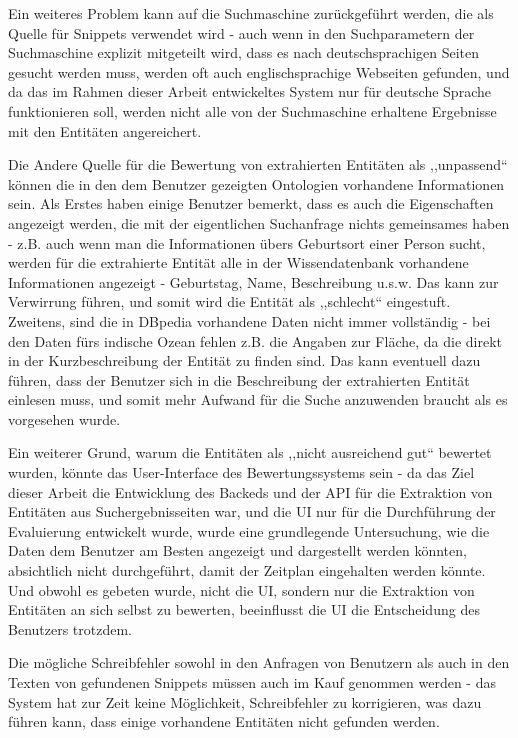 Ein weiteres Problem kann auf die Suchmaschine zurückgeführt werden, die als Quelle für Snippets verwendet wird - auch wenn in den Suchparametern der Suchmaschine explizit mitgeteilt wird, dass es nach deutschsprachigen Seiten gesucht werden muss, werden oft auch englischsprachige Webseiten gefunden, und da das im Rahmen dieser Arbeit entwickeltes System nur für deutsche Sprache funktionieren soll, werden nicht alle von der Suchmaschine erhaltene Ergebnisse mit den Entitäten angereichert.

Die Andere Quelle für die Bewertung von extrahierten Entitäten als ,,unpassend`` können die in den dem Benutzer gezeigten Ontologien vorhandene Informationen sein. Als Erstes haben einige Benutzer bemerkt, dass es auch die Eigenschaften angezeigt werden, die mit der eigentlichen Suchanfrage nichts gemeinsames haben - z.B. auch wenn man die Informationen übers Geburtsort einer Person sucht, werden für die extrahierte Entität alle in der Wissendatenbank vorhandene Informationen angezeigt - Geburtstag, Name, Beschreibung u.s.w. Das kann zur Verwirrung führen, und somit wird die Entität als ,,schlecht`` eingestuft. Zweitens, sind die in DBpedia vorhandene Daten nicht immer vollständig - bei den Daten fürs indische Ozean fehlen z.B. die Angaben zur Fläche, da die direkt in der Kurzbeschreibung der Entität zu finden sind. Das kann eventuell dazu führen, dass der Benutzer sich in die Beschreibung der extrahierten Entität einlesen muss, und somit mehr Aufwand für die Suche anzuwenden braucht als es vorgesehen wurde. 

Ein weiterer Grund, warum die Entitäten als ,,nicht ausreichend gut`` bewertet wurden, könnte das User-Interface des Bewertungssystems sein - da das Ziel dieser Arbeit die Entwicklung des Backeds und der API für die Extraktion von Entitäten aus Suchergebnisseiten war, und die UI nur für die Durchführung der Evaluierung entwickelt wurde, wurde eine grundlegende Untersuchung, wie die Daten dem Benutzer am Besten angezeigt und dargestellt werden könnten, absichtlich nicht durchgeführt, damit der Zeitplan eingehalten werden könnte. Und obwohl es gebeten wurde, nicht die UI, sondern nur die Extraktion von Entitäten an sich selbst zu bewerten, beeinflusst die UI die Entscheidung des Benutzers trotzdem. 

Die mögliche Schreibfehler sowohl in den Anfragen von Benutzern als auch in den Texten von gefundenen Snippets müssen auch im Kauf genommen werden - das System hat zur Zeit keine Möglichkeit, Schreibfehler zu korrigieren, was dazu führen kann, dass einige vorhandene Entitäten nicht gefunden werden.

